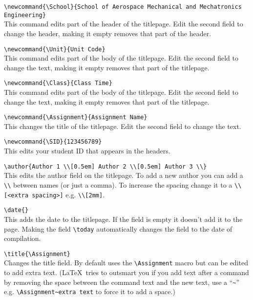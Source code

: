 \documentclass[a4paper, 12pt, english]{article}
\begin{document}
            \verb+\newcommand{\School}{School of Aerospace Mechanical and Mechatronics Engineering}+\\
            This command edits part of the header of the titlepage. Edit the second field to change the header, making it empty removes that part of the header.

            \verb+\newcommand{\Unit}{Unit Code}+\\
            This command edits part of the body of the titlepage. Edit the second field to change the text, making it empty removes that part of the titlepage.

            \verb+\newcommand{\Class}{Class Time}+\\
            This command edits part of the body of the titlepage. Edit the second field to change the text, making it empty removes that part of the titlepage.

            \verb+\newcommand{\Assignment}{Assignment Name}+\\
            This changes the title of the titlepage. Edit the second field to change the text.

            \verb+\newcommand{\SID}{123456789}+\\
            This edits your student ID that appears in the headers.

            \verb+\author{Author 1 \\[0.5em] Author 2 \\[0.5em] Author 3 \\}+\\
            This edits the author field on the titlepage. To add a new author you can add a \verb+\\+ between names (or just a comma). To increase the spacing change it to a \verb+\\[<extra spacing>]+ e.g. \verb+\\[2mm]+.

            \verb+\date{}+\\
            This adds the date to the titlepage. If the field is empty it doesn't add it to the page. Making the field \verb+\today+ automatically changes the field to the date of compilation.

            \newpage

            \verb+\title{\Assignment}+\\
            Changes the title field. By default uses the \verb+\Assignment+ macro but can be edited to add extra text. (\LaTeX~tries to outsmart you if you add text after a command by removing the space between the command text and the new text, use a ``\verb+~+'' e.g. \verb+\Assignment~extra text+ to force it to add a space.)
\end{document}
